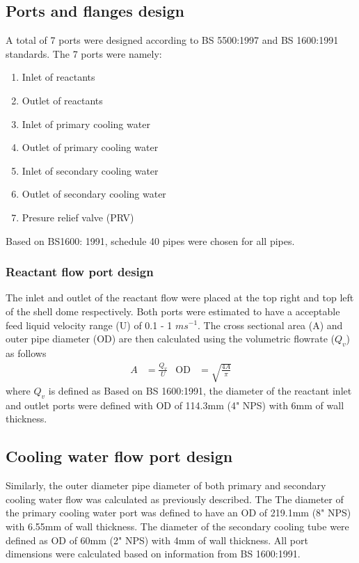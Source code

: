\subsection{Ports and flanges design}
A total of 7 ports were designed according to BS 5500:1997 and BS 1600:1991 standards. The 7 ports were namely:
\begin{enumerate}
    \item Inlet of reactants
    \item Outlet of reactants
    \item Inlet of primary cooling water
    \item Outlet of primary cooling water
    \item Inlet of secondary cooling water
    \item Outlet of secondary cooling water
    \item Presure relief valve (PRV)
\end{enumerate}
Based on BS1600: 1991, schedule 40 pipes were chosen for all pipes. 
\subsubsection{Reactant flow port design}
The inlet and outlet of the reactant flow were placed at the top right and top left of the shell dome respectively. Both ports were estimated to have a acceptable feed liquid velocity range (U) of 0.1 - 1 $ms^{-1}$. The cross sectional area (A) and outer pipe diameter (OD) are then calculated using the volumetric flowrate ($Q_v$) as follows
\begin{align}
    A &= \frac{Q_v}{U} &
    \mathrm{OD} &= \sqrt{\frac{4A}{\pi}}
\end{align}
where $Q_v$ is defined as 
Based on BS 1600:1991, the diameter of the reactant inlet and outlet ports were defined with OD of 114.3mm (4" NPS) with 6mm of wall thickness. 

\subsection{Cooling water flow port design}
Similarly, the outer diameter pipe diameter of both primary and secondary cooling water flow was calculated as previously described. The 
The diameter of the primary cooling water port was defined to have an OD of 219.1mm (8" NPS) with 6.55mm of wall thickness. The diameter of the secondary cooling tube were defined as OD of 60mm (2" NPS) with 4mm of wall thickness. All port dimensions were calculated based on information from BS 1600:1991. 


